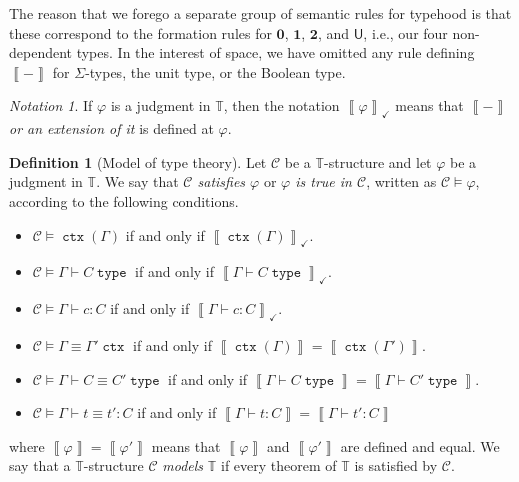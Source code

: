 \documentclass[10pt,letterpaper,cm]{nupset}
\theoremstyle{definition}
\newtheorem{definition}{Definition}[subsection]
\theoremstyle{theorem}
\theoremstyle{remark}
\newtheorem*{notation}{Notation}
\newcommand{\U}{\mathsf{U}}
\newcommand{\0}{\mathbf{0}}
\newcommand{\1}{\mathbf{1}}
\newcommand{\2}{\mathbf{2}}
\DeclareMathOperator{\ctx}{\mathtt{ctx}}
\DeclareMathOperator{\type}{\mathtt{type}}
\renewcommand{\c}{\mathscr{C}}
\newcommand{\T}{\mathbb T}
\newcommand{\bi}{\begin{itemize}}
\newcommand{\ei}{\end{itemize}}
\begin{document}
\medskip

The reason that we forego a separate group of semantic rules for typehood is that these correspond to the formation rules for $\0$, $\1$, $\2$, and $\U$, i.e., our four non-dependent types. In the interest of space, we have omitted any rule defining $\left\llbracket{-}\right\rrbracket$ for $\Sigma$-types, the unit type, or the Boolean type.

\medskip

\begin{notation}
If $\varphi$ is a judgment in $\T$, then the notation $\left\llbracket{\varphi}\right\rrbracket_{\checkmark}$ means that $\left\llbracket{-}\right\rrbracket$ \emph{or an extension of it} is defined at $\varphi$.
\end{notation}

\begin{definition}[Model of type theory]\label{satis1}
Let $\c$ be a $\T$-structure and let $\varphi$ be a judgment in $\T$. We say that \textit{$\c$ satisfies $\varphi$} or \textit{$\varphi$ is true in $\c$}, written as $\c \models \varphi$, according to the following conditions.
\bi
\item $\c \models {\ctx(\Gamma)}$ if and only if  $\left\llbracket{\ctx(\Gamma)}\right\rrbracket_{\checkmark}$.
\item $\c \models {\Gamma \vdash C \type}$ if and only if $\left\llbracket{\Gamma \vdash C \type}\right\rrbracket_{\checkmark}$.
\item $\c \models {\Gamma \vdash c:C}$ if and only if $\left\llbracket{\Gamma \vdash c:C}\right\rrbracket_{\checkmark}$.
\item  $\c \models { \Gamma \equiv \Gamma'  \ctx}$ if and only if $\left\llbracket{\ctx(\Gamma)}\right\rrbracket = \left\llbracket{\ctx(\Gamma')}\right\rrbracket$.
\item $\c \models {\Gamma \vdash  C \equiv C' \type}$ if and only if $\left\llbracket{\Gamma \vdash C \type}\right\rrbracket = \left\llbracket{\Gamma \vdash C' \type}\right\rrbracket$.
\item $\c \models { \Gamma \vdash t \equiv t' : C}$ if and only if $\left\llbracket{\Gamma \vdash t : C}\right\rrbracket = \left\llbracket{\Gamma \vdash t' : C}\right\rrbracket$
\ei
where $\left\llbracket{\varphi}\right\rrbracket=\left\llbracket{\varphi'}\right\rrbracket $ means that $\left\llbracket{\varphi}\right\rrbracket$ and $\left\llbracket{\varphi'}\right\rrbracket$ are defined and equal.  
We say that a $\T$-structure $\c$ \textit{models} $\T$ if every theorem of $\T$ is satisfied by $\c$.
\end{definition}
\end{document}
